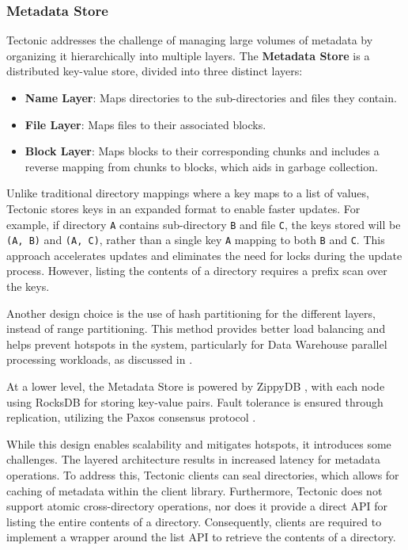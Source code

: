\subsubsection{Metadata Store}\label{sec:metadata_store}
Tectonic addresses the challenge of managing large volumes of metadata by organizing it hierarchically into multiple layers. The \textbf{Metadata Store} is a distributed key-value store, divided into three distinct layers:

\begin{itemize}\label{list:metadata_layers}
    \item \textbf{Name Layer}: Maps directories to the sub-directories and files they contain.
    \item \textbf{File Layer}: Maps files to their associated blocks.
    \item \textbf{Block Layer}: Maps blocks to their corresponding chunks and includes a reverse mapping from chunks to blocks, which aids in garbage collection.
\end{itemize}

Unlike traditional directory mappings where a key maps to a list of values, Tectonic stores keys in an expanded format to enable faster updates. For example, if directory \texttt{A} contains sub-directory \texttt{B} and file \texttt{C}, the keys stored will be \texttt{(A, B)} and \texttt{(A, C)}, rather than a single key \texttt{A} mapping to both \texttt{B} and \texttt{C}. This approach accelerates updates and eliminates the need for locks during the update process. However, listing the contents of a directory requires a prefix scan over the keys.

Another design choice is the use of hash partitioning for the different layers, instead of range partitioning. This method provides better load balancing and helps prevent hotspots in the system, particularly for Data Warehouse parallel processing workloads, as discussed in .

At a lower level, the Metadata Store is powered by ZippyDB \cite{zippydb}, with each node using RocksDB \cite{rocksdb} for storing key-value pairs. Fault tolerance is ensured through replication, utilizing the Paxos consensus protocol \cite{paxos}.

While this design enables scalability and mitigates hotspots, it introduces some challenges. The layered architecture results in increased latency for metadata operations. To address this, Tectonic clients can seal directories, which allows for caching of metadata within the client library. Furthermore, Tectonic does not support atomic cross-directory operations, nor does it provide a direct API for listing the entire contents of a directory. Consequently, clients are required to implement a wrapper around the list API to retrieve the contents of a directory.


